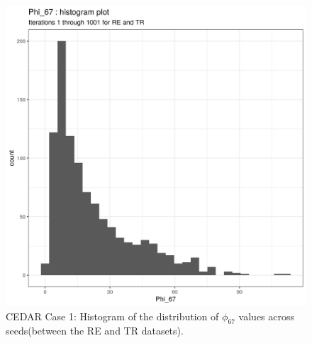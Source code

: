 \documentclass[14pt]{extarticle} %
\begin{document}
	\begin{figure}[h]
		\centering
		\includegraphics[scale=0.75]{Images/Biology_data/Set_250/All_datasets/Phi_histograms/Phi_67_histogram_plot.png}
		\caption{CEDAR Case 1: Histogram of the distribution of $\phi_{67}$ values across seeds(between the RE and TR datasets).}
		\label{fig:results:cedar_1:mdi_re_tr_phi_histogram}
	\end{figure}
	
	\newpage
	
\end{document}
